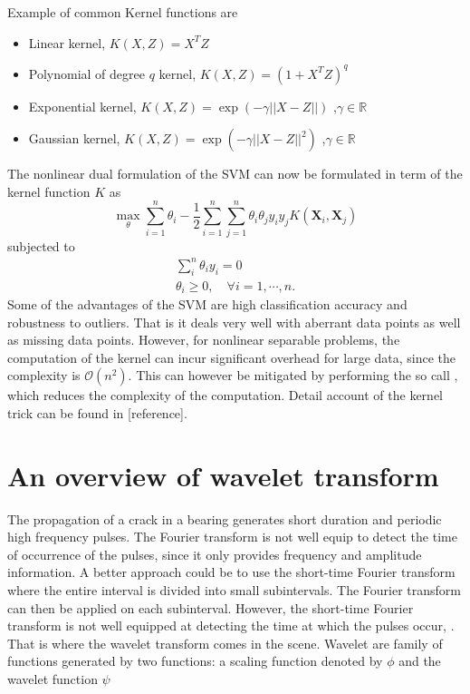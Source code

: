 \documentclass[../Main/thesis.tex]{subfiles}
\begin{document}
\justify
Example of common Kernel functions are 
\begin{itemize}
\item Linear kernel,  $K\left(X,Z\right) = X^{T}Z$
\item Polynomial of degree $q$ kernel, $K\left(X,Z\right) = \left(1+X^{T}Z\right)^{q}$ 
\item Exponential kernel,  $K(X,Z) = \exp\left(-\gamma ||X-Z||\right)$ ,$\gamma\in\mathbb{R}$
\item Gaussian kernel,  $K(X,Z) = \exp\left(-\gamma ||X-Z||^{2}\right)$ ,$\gamma\in\mathbb{R}$
\end{itemize}
The nonlinear dual formulation of the SVM can now be formulated in term of the kernel function $K$ as 
\begin{equation}
\max_{\theta}\sum_{i=1}^{n}\theta_{i} - \frac{1}{2}\sum_{i=1}^{n}\sum_{j=1}^{n}\theta_{i}\theta_{j}y_{i}y_{j}K\left(\bm{X}_{i},\bm{X}_{j}\right)
\end{equation}
subjected to 
\begin{equation}
\begin{split}
\sum_{i}^{n}\theta_{i}y_{i} = 0\\
\theta_{i} \geq 0, \quad \forall i = 1,\cdots,n.
\end{split}
\end{equation}
\justify
Some of the advantages of the SVM are high classification accuracy and robustness to outliers. That is it deals very well with aberrant data points as well as missing data points. However, for nonlinear separable problems, the computation of the kernel can incur significant overhead for large data, since the complexity is $\mathcal{O}\left(n^{2}\right)$. This can however be mitigated by performing the so call , which reduces the complexity of the computation. Detail account of the kernel trick can be found in [reference]. 
\section{An overview of wavelet transform}
\label{sec:wavelet}
The propagation of a crack in a bearing generates short duration and periodic high frequency pulses. The Fourier transform is not well equip to detect the time of occurrence of the pulses, since it only provides frequency and amplitude information. A better approach could be to use the short-time Fourier transform where the entire interval is divided into small subintervals. The Fourier transform can then be applied on each subinterval. However, the short-time Fourier transform is not well equipped at detecting the time at which the pulses occur, \cite{albert09}. That is where the wavelet transform comes in the scene.
\justify
Wavelet are family of functions generated by two functions: a scaling function denoted by $\phi$ and the wavelet function $\psi$
\end{document}

